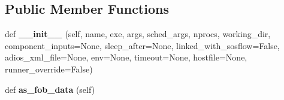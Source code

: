 \subsection*{Public Member Functions}
\begin{DoxyCompactItemize}
\item 
\mbox{\label{classcodar_1_1cheetah_1_1model_1_1_run_component_a3fefe66c8e1f1f912a617e900ba6c75b}} 
def {\bfseries \+\_\+\+\_\+init\+\_\+\+\_\+} (self, name, exe, args, sched\+\_\+args, nprocs, working\+\_\+dir, component\+\_\+inputs=None, sleep\+\_\+after=None, linked\+\_\+with\+\_\+sosflow=False, adios\+\_\+xml\+\_\+file=None, env=None, timeout=None, hostfile=None, runner\+\_\+override=False)
\item 
\mbox{\label{classcodar_1_1cheetah_1_1model_1_1_run_component_a9400f073612f8afefa3568e0205b3770}} 
def {\bfseries as\+\_\+fob\+\_\+data} (self)
\end{DoxyCompactItemize}
